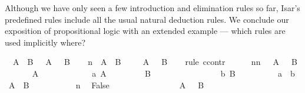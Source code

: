 \begin{isabellebody}
\begin{isamarkuptext}
Although we have only seen a few introduction and elimination rules so
far, Isar's predefined rules include all the usual natural deduction
rules. We conclude our exposition of propositional logic with an extended
example --- which rules are used implicitly where?%
\end{isamarkuptext}%
\isamarkuptrue%
\isamarkupfalse%
\ {\isachardoublequoteopen}{\isasymnot}\ {\isacharparenleft}A\ {\isasymand}\ B{\isacharparenright}\ {\isasymlongrightarrow}\ {\isasymnot}\ A\ {\isasymor}\ {\isasymnot}\ B{\isachardoublequoteclose}\isanewline
%
\isadelimproof
%
\endisadelimproof
%
\isatagproof
{}\isamarkupfalse%
\isanewline
\ \ \isamarkupfalse%
\ n{\isacharcolon}\ {\isachardoublequoteopen}{\isasymnot}\ {\isacharparenleft}A\ {\isasymand}\ B{\isacharparenright}{\isachardoublequoteclose}\isanewline
\ \ \isamarkupfalse%
\ {\isachardoublequoteopen}{\isasymnot}\ A\ {\isasymor}\ {\isasymnot}\ B{\isachardoublequoteclose}\isanewline
\ \ \isamarkupfalse%
\ {\isacharparenleft}rule\ ccontr{\isacharparenright}\isanewline
\ \ \ \ \isamarkupfalse%
\ nn{\isacharcolon}\ {\isachardoublequoteopen}{\isasymnot}\ {\isacharparenleft}{\isasymnot}\ A\ {\isasymor}\ {\isasymnot}\ B{\isacharparenright}{\isachardoublequoteclose}\isanewline
\ \ \ \ \isamarkupfalse%
\ {\isachardoublequoteopen}{\isasymnot}\ A{\isachardoublequoteclose}\isanewline
\ \ \ \ \isamarkupfalse%
\isanewline
\ \ \ \ \ \ \isamarkupfalse%
\ a{\isacharcolon}\ {\isachardoublequoteopen}A{\isachardoublequoteclose}\isanewline
\ \ \ \ \ \ \isamarkupfalse%
\ {\isachardoublequoteopen}{\isasymnot}\ B{\isachardoublequoteclose}\isanewline
\ \ \ \ \ \ \isamarkupfalse%
\isanewline
\ \ \ \ \ \ \ \ \isamarkupfalse%
\ b{\isacharcolon}\ {\isachardoublequoteopen}B{\isachardoublequoteclose}\isanewline
\ \ \ \ \ \ \ \ \isamarkupfalse%
\ a\ \ b\ \isamarkupfalse%
\ {\isachardoublequoteopen}A\ {\isasymand}\ B{\isachardoublequoteclose}\ \isacommand{{\isachardot}{\isachardot}}\isamarkupfalse%
\isanewline
\ \ \ \ \ \ \ \ \isamarkupfalse%
\ n\ \isamarkupfalse%
\ False\ \isacommand{{\isachardot}{\isachardot}}\isamarkupfalse%
\isanewline
\ \ \ \ \ \ \isamarkupfalse%
\isanewline
\ \ \ \ \ \ \isamarkupfalse%
\ {\isachardoublequoteopen}{\isasymnot}\ A\ {\isasymor}\ {\isasymnot}\ B{\isachardoublequoteclose}\ \isacommand{{\isachardot}{\isachardot}}\isamarkupfalse%

\end{isabellebody}
